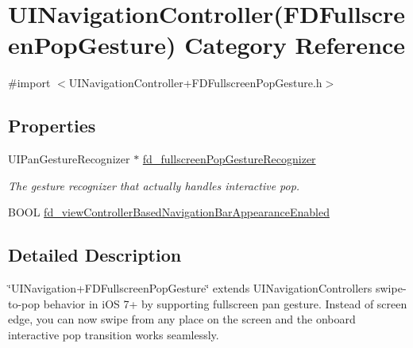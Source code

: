 \hypertarget{category_u_i_navigation_controller_07_f_d_fullscreen_pop_gesture_08}{}\section{U\+I\+Navigation\+Controller(F\+D\+Fullscreen\+Pop\+Gesture) Category Reference}
\label{category_u_i_navigation_controller_07_f_d_fullscreen_pop_gesture_08}


{\ttfamily \#import $<$U\+I\+Navigation\+Controller+\+F\+D\+Fullscreen\+Pop\+Gesture.\+h$>$}

\subsection*{Properties}
\begin{DoxyCompactItemize}
\item 
\mbox{\label{category_u_i_navigation_controller_07_f_d_fullscreen_pop_gesture_08_ab1184049f100278fc14bfc88789abdc0}} 
U\+I\+Pan\+Gesture\+Recognizer $\ast$ \mbox{\hyperlink{category_u_i_navigation_controller_07_f_d_fullscreen_pop_gesture_08_ab1184049f100278fc14bfc88789abdc0}{fd\+\_\+fullscreen\+Pop\+Gesture\+Recognizer}}
\begin{DoxyCompactList}\small\item\em The gesture recognizer that actually handles interactive pop. \end{DoxyCompactList}\item 
B\+O\+OL \mbox{\hyperlink{category_u_i_navigation_controller_07_f_d_fullscreen_pop_gesture_08_a42b42cdd60b7ddf8a22fd0fe5bfa36f5}{fd\+\_\+view\+Controller\+Based\+Navigation\+Bar\+Appearance\+Enabled}}
\end{DoxyCompactItemize}


\subsection{Detailed Description}
\char`\"{}\+U\+I\+Navigation+\+F\+D\+Fullscreen\+Pop\+Gesture\char`\"{} extends U\+I\+Navigation\+Controller\textquotesingle{}s swipe-\/ to-\/pop behavior in i\+OS 7+ by supporting fullscreen pan gesture. Instead of screen edge, you can now swipe from any place on the screen and the onboard interactive pop transition works seamlessly.

